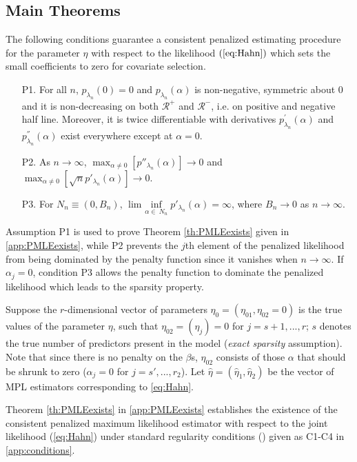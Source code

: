 \documentclass[11pt]{statsoc}
\begin{document}
\subsection{Main Theorems} \label{theorems}

The following conditions guarantee a consistent
penalized estimating procedure for the parameter $\eta$ with respect to the likelihood $(\ref{eq:Hahn})$ which sets the small coefficients to zero for
covariate selection.
\begin{itemize}

\item[P1.]     For all $n$, $p_{\lambda_{n}}(0)=0$ and $p_{\lambda_{n}}(\alpha)$ is non-negative, symmetric about 0 and it is non-decreasing on both $\mathcal{R}^{+}$ and $\mathcal{R}^{-}$, i.e. on positive and negative half line. Moreover, it is twice differentiable with derivatives $p_{\lambda_{n}}^{'}(\alpha)$ and $p_{\lambda_{n}}^{''}(\alpha)$ exist everywhere except at $\alpha = 0$.

\item[P2.] As $n \rightarrow \infty$, $\max_{\alpha\neq0}[ p''_{\lambda_n}(\alpha) ] \rightarrow 0$ and
$\max_{\alpha\neq0}[ \sqrt np'_{\lambda_n}(\alpha) ] \rightarrow 0$.

\item[P3.] For $N_n \equiv (0,B_n)$, $\text{lim $\inf\limits_{\alpha \in \:
    N_n}$}  p'_{\lambda_n}(\alpha) = \infty$, where $B_n \rightarrow 0$ as $n \rightarrow \infty$.
\end{itemize}
Assumption P1 is used to prove Theorem \ref{th:PMLEexists} given in \ref{app:PMLEexists}, while P2 prevents
the $j$th element of the penalized likelihood from being dominated by the
penalty function since it vanishes when $n \rightarrow \infty$. If
$\alpha_{j}=0$, condition P3 allows the penalty function to dominate the
penalized likelihood which leads to the sparsity property.

Suppose the  $r$-dimensional vector of parameters $\eta_0=(\eta_{01},\eta_{02}=0)$ is the true values of the parameter $\eta$, such that
$\eta_{02}=(\eta_j) = 0$ for $j=s+1,...,r$; $s$ denotes the true number of
predictors present in the model ({\it exact sparsity} assumption).  Note that since there is no penalty on the
$\beta$s, $\eta_{02}$ consists of those $\alpha$ that should be shrunk to zero
($\alpha_j=0$ for $j=s',...,r_2$).  Let $\widehat \eta=(\widehat \eta_1,\widehat \eta_2)$ be the vector of MPL estimators  corresponding to \eqref{eq:Hahn}. 

Theorem \ref{th:PMLEexists} in \ref{app:PMLEexists} establishes the existence of the consistent penalized maximum likelihood estimator with respect to the
joint likelihood (\ref{eq:Hahn}) under standard regularity conditions (\cite{ibragimov1981statistical}) given as C1-C4 in \ref{app:conditions}.
\end{document}
